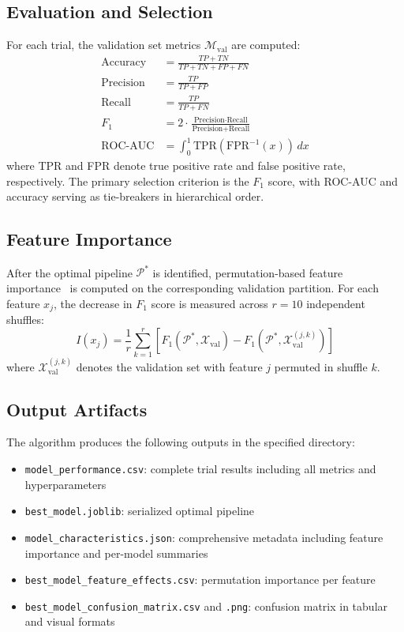 \documentclass[diagnostics,article,submit,pdftex,moreauthors]{Definitions/mdpi}
\begin{document}
\subsection[\appendixname~\thesubsection]{Evaluation and Selection}
For each trial, the validation set metrics $\mathcal{M}_{\text{val}}$ are computed:
\begin{align}
\text{Accuracy} &= \frac{TP + TN}{TP + TN + FP + FN} \\
\text{Precision} &= \frac{TP}{TP + FP} \\
\text{Recall} &= \frac{TP}{TP + FN} \\
F_1 &= 2 \cdot \frac{\text{Precision} \cdot \text{Recall}}{\text{Precision} + \text{Recall}} \\
\text{ROC-AUC} &= \int_{0}^{1} \text{TPR}(\text{FPR}^{-1}(x)) \, dx
\end{align}
where TPR and FPR denote true positive rate and false positive rate, respectively. The primary selection criterion is the $F_1$ score, with ROC-AUC and accuracy serving as tie-breakers in hierarchical order.

\subsection[\appendixname~\thesubsection]{Feature Importance}
After the optimal pipeline $\mathcal{P}^*$ is identified, permutation-based feature importance~\cite{breiman2001randomforest} is computed on the corresponding validation partition. For each feature $x_j$, the decrease in $F_1$ score is measured across $r = 10$ independent shuffles:
\[
I(x_j) = \frac{1}{r} \sum_{k=1}^{r} \left[ F_1(\mathcal{P}^*, \mathcal{X}_{\text{val}}) - F_1(\mathcal{P}^*, \mathcal{X}_{\text{val}}^{(j,k)}) \right]
\]
where $\mathcal{X}_{\text{val}}^{(j,k)}$ denotes the validation set with feature $j$ permuted in shuffle $k$.

\subsection[\appendixname~\thesubsection]{Output Artifacts}
The algorithm produces the following outputs in the specified directory:
\begin{itemize}
    \item \texttt{model\_performance.csv}: complete trial results including all metrics and hyperparameters
    \item \texttt{best\_model.joblib}: serialized optimal pipeline
    \item \texttt{model\_characteristics.json}: comprehensive metadata including feature importance and per-model summaries
    \item \texttt{best\_model\_feature\_effects.csv}: permutation importance per feature
    \item \texttt{best\_model\_confusion\_matrix.csv} and \texttt{.png}: confusion matrix in tabular and visual formats
\end{itemize}
\end{document}
